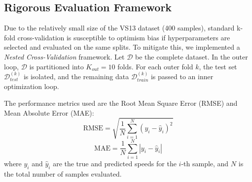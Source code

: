 \documentclass[conference]{IEEEtran}
\begin{document}
\subsection{Rigorous Evaluation Framework}
Due to the relatively small size of the VS13 dataset (400 samples), standard k-fold cross-validation is susceptible to optimism bias if hyperparameters are selected and evaluated on the same splits. To mitigate this, we implemented a \textit{Nested Cross-Validation} framework. Let $\mathcal{D}$ be the complete dataset. In the outer loop, $\mathcal{D}$ is partitioned into $K_{out} = 10$ folds. For each outer fold $k$, the test set $\mathcal{D}_{test}^{(k)}$ is isolated, and the remaining data $\mathcal{D}_{train}^{(k)}$ is passed to an inner optimization loop.

The performance metrics used are the Root Mean Square Error (RMSE) and Mean Absolute Error (MAE):
\begin{equation}
    \text{RMSE} = \sqrt{\frac{1}{N}\sum_{i=1}^{N}(y_i - \hat{y}_i)^2}
\end{equation}
\begin{equation}
    \text{MAE} = \frac{1}{N}\sum_{i=1}^{N}|y_i - \hat{y}_i|
\end{equation}
where $y_i$ and $\hat{y}_i$ are the true and predicted speeds for the $i$-th sample, and $N$ is the total number of samples evaluated.
\end{document}
